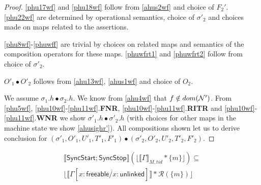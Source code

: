 \begin{proof}
\ref{phu17wf} and \ref{phu18wf} follow from \ref{ahus2wf} and choice of $F_2'$.  \ref{phu22wf} are determined by operational semantics, choice of $\sigma'_2$ and choices made on maps related to the assertions.

\ref{phu8wf}-\ref{phuwff} are trivial by choices on related maps and semantics of the composition operators for these maps. \ref{phuwfrt1} and \ref{phuwfrt2} follow from choice of $\sigma'_2$.

$O'_1 \bullet O'_2 $ follows from \ref{ahu13wf}, \ref{ahus1wf} and choice of $O_2$. 

We assume $\sigma_1.h \bullet \sigma_2.h$. We know from \ref{ahu4wf} that $f \notin dom(\mathcal{N}')$. From \ref{phu5wf}, \ref{phu10wf}-\ref{phu11wf}.\textbf{FNR}, \ref{phu10wf}-\ref{phu11wf}.\textbf{RITR} and \ref{phu10wf}-\ref{phu11wf}.\textbf{WNR} we show $\sigma'_1.h \bullet \sigma'_2.h$ (with choices for other maps in the machine state we show \ref{ahusighr'}). All compositions shown  let us to derive conclusion for $(\sigma'_1, O'_1, U'_1, T'_1,F'_1) \bullet (\sigma'_2, O'_2, U'_2, T'_2,F'_2) $.
 \end{proof}
\begin{lemma}
   \label{lemma:syncstop}
   \begin{align*}
  \llbracket  \textsf{SyncStart};\textsf{SyncStop} \rrbracket (\lfloor \llbracket \Gamma  \rrbracket_{M,tid} * \{m\}\rfloor)  \subseteq \\
                                                              \lfloor \llbracket \Gamma[\overline{x:\textsf{freeable}/x:\textsf{unlinked}}] \rrbracket  * \mathcal{R}(\{m\})\rfloor
\end{align*}
 \end{lemma}
